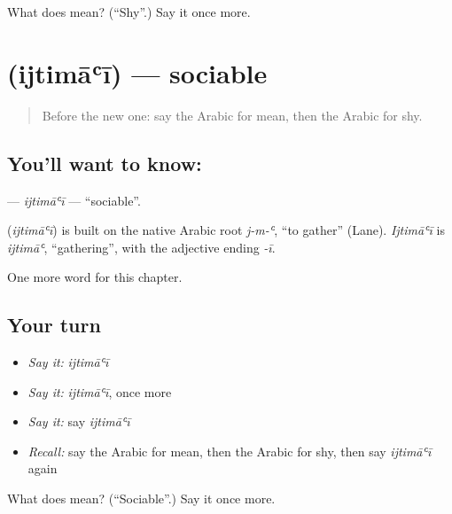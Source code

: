 \begin{tcolorbox}[breakable,colback=teal!4,colframe=teal!35!black,title={Before you move on}]
What does  mean? (\textquotedblleft{}Shy\textquotedblright{}.) Say it once more.
\end{tcolorbox}
\section[\texorpdfstring{\ar{اجتماعي} (ijtimāʿī)}{اجتماعي (ijtimāʿī)}]{ (ijtimāʿī) — sociable}

\label{lesson:AR-C210-ijtimai}



\begin{quote}
Before the new one: say the Arabic for mean, then the Arabic for shy.
\end{quote}

\subsection*{You'll want to know: }
\textbf{} — \emph{ijtimāʿī} — \textquotedblleft{}sociable\textquotedblright{}.

\begin{cousinweb}
\textbf{} (\emph{ijtimāʿī}) is built on the native Arabic root \emph{j-m-ʿ}, \textquotedblleft{}to gather\textquotedblright{} (Lane). \emph{Ijtimāʿī} is \emph{ijtimāʿ}, \textquotedblleft{}gathering\textquotedblright{}, with the adjective ending \emph{-ī}.
\end{cousinweb}

\begin{grammarlens}[title={What you've built}]
One more word for this chapter.
\end{grammarlens}

\subsection*{Your turn}
\begin{itemize}
\raggedright
  \item \emph{Say it:} \emph{ijtimāʿī}
  \item \emph{Say it:} \emph{ijtimāʿī}, once more
  \item \emph{Say it:} say \emph{ijtimāʿī}
  \item \emph{Recall:} say the Arabic for mean, then the Arabic for shy, then say \emph{ijtimāʿī} again
\end{itemize}

\begin{tcolorbox}[breakable,colback=teal!4,colframe=teal!35!black,title={Before you move on}]
What does  mean? (\textquotedblleft{}Sociable\textquotedblright{}.) Say it once more.
\end{tcolorbox}
